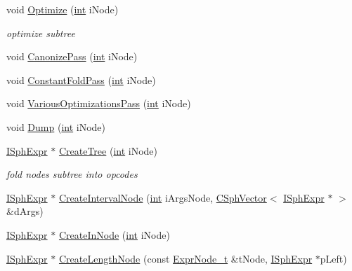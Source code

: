 \begin{DoxyCompactItemize}
\item 
void \hyperlink{classExprParser__t_a00b8121ab8ab54ba834b25e00a3a349a}{Optimize} (\hyperlink{sphinxexpr_8cpp_a4a26e8f9cb8b736e0c4cbf4d16de985e}{int} i\-Node)
\begin{DoxyCompactList}\small\item\em optimize subtree \end{DoxyCompactList}\item 
void \hyperlink{classExprParser__t_afd5ce676b83d3588e5c3522d3095e32a}{Canonize\-Pass} (\hyperlink{sphinxexpr_8cpp_a4a26e8f9cb8b736e0c4cbf4d16de985e}{int} i\-Node)
\item 
void \hyperlink{classExprParser__t_afa6da2b74eac5775ad8e2586638d0186}{Constant\-Fold\-Pass} (\hyperlink{sphinxexpr_8cpp_a4a26e8f9cb8b736e0c4cbf4d16de985e}{int} i\-Node)
\item 
void \hyperlink{classExprParser__t_afdd2616779ece56eb4a7646b4890b784}{Various\-Optimizations\-Pass} (\hyperlink{sphinxexpr_8cpp_a4a26e8f9cb8b736e0c4cbf4d16de985e}{int} i\-Node)
\item 
void \hyperlink{classExprParser__t_a44bb95929d2d960aba3c07d3558578c8}{Dump} (\hyperlink{sphinxexpr_8cpp_a4a26e8f9cb8b736e0c4cbf4d16de985e}{int} i\-Node)
\item 
\hyperlink{structISphExpr}{I\-Sph\-Expr} $\ast$ \hyperlink{classExprParser__t_a5db17f0a4fb7360eb2439b112a098d47}{Create\-Tree} (\hyperlink{sphinxexpr_8cpp_a4a26e8f9cb8b736e0c4cbf4d16de985e}{int} i\-Node)
\begin{DoxyCompactList}\small\item\em fold nodes subtree into opcodes \end{DoxyCompactList}\item 
\hyperlink{structISphExpr}{I\-Sph\-Expr} $\ast$ \hyperlink{classExprParser__t_a446769eedb5a6b020484dbeae4d102e7}{Create\-Interval\-Node} (\hyperlink{sphinxexpr_8cpp_a4a26e8f9cb8b736e0c4cbf4d16de985e}{int} i\-Args\-Node, \hyperlink{classCSphVector}{C\-Sph\-Vector}$<$ \hyperlink{structISphExpr}{I\-Sph\-Expr} $\ast$ $>$ \&d\-Args)
\item 
\hyperlink{structISphExpr}{I\-Sph\-Expr} $\ast$ \hyperlink{classExprParser__t_a436d58135e5b8c1d531a471d80e23b7b}{Create\-In\-Node} (\hyperlink{sphinxexpr_8cpp_a4a26e8f9cb8b736e0c4cbf4d16de985e}{int} i\-Node)
\item 
\hyperlink{structISphExpr}{I\-Sph\-Expr} $\ast$ \hyperlink{classExprParser__t_aafb759ad509bf213e4ad823429ed304e}{Create\-Length\-Node} (const \hyperlink{structExprNode__t}{Expr\-Node\-\_\-t} \&t\-Node, \hyperlink{structISphExpr}{I\-Sph\-Expr} $\ast$p\-Left)

\end{DoxyCompactItemize}
